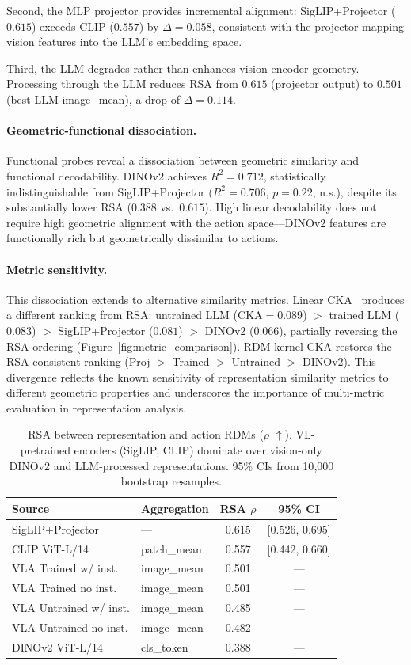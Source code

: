Second, the MLP projector provides incremental alignment: SigLIP+Projector ($0.615$) exceeds CLIP ($0.557$) by $\Delta = 0.058$, consistent with the projector mapping vision features into the LLM's embedding space.

Third, the LLM degrades rather than enhances vision encoder geometry.
Processing through the LLM reduces RSA from $0.615$ (projector output) to $0.501$ (best LLM image\_mean), a drop of $\Delta = 0.114$.

\paragraph{Geometric-functional dissociation.}
Functional probes reveal a dissociation between geometric similarity and functional decodability.
DINOv2 achieves $R^2 = 0.712$, statistically indistinguishable from SigLIP+Projector ($R^2 = 0.706$, $p = 0.22$, n.s.), despite its substantially lower RSA ($0.388$ vs.\ $0.615$).
High linear decodability does not require high geometric alignment with the action space---DINOv2 features are functionally rich but geometrically dissimilar to actions.

\paragraph{Metric sensitivity.}
This dissociation extends to alternative similarity metrics.
Linear CKA~\cite{kornblith2019} produces a different ranking from RSA: untrained LLM ($\text{CKA} = 0.089$) $>$ trained LLM ($0.083$) $>$ SigLIP+Projector ($0.081$) $>$ DINOv2 ($0.066$), partially reversing the RSA ordering (Figure~\ref{fig:metric_comparison}).
RDM kernel CKA restores the RSA-consistent ranking (Proj $>$ Trained $>$ Untrained $>$ DINOv2).
This divergence reflects the known sensitivity of representation similarity metrics to different geometric properties and underscores the importance of multi-metric evaluation in representation analysis.

\begin{table}[t]
\centering
\caption{RSA between representation and action RDMs ($\rho$ $\uparrow$). VL-pretrained encoders (SigLIP, CLIP) dominate over vision-only DINOv2 and LLM-processed representations. 95\% CIs from 10{,}000 bootstrap resamples.}
\label{tab:rsa_overview}
\small
\begin{tabular}{llcc}
\toprule
Source & Aggregation & RSA $\rho$ & 95\% CI \\
\midrule
SigLIP+Projector & --- & 0.615 & {[0.526, 0.695]} \\
CLIP ViT-L/14 & patch\_mean & 0.557 & {[0.442, 0.660]} \\
\midrule
VLA Trained w/ inst. & image\_mean & 0.501 & --- \\
VLA Trained no inst. & image\_mean & 0.501 & --- \\
VLA Untrained w/ inst. & image\_mean & 0.485 & --- \\
VLA Untrained no inst. & image\_mean & 0.482 & --- \\
\midrule
DINOv2 ViT-L/14 & cls\_token & 0.388 & --- \\
\bottomrule
\end{tabular}
\end{table}

